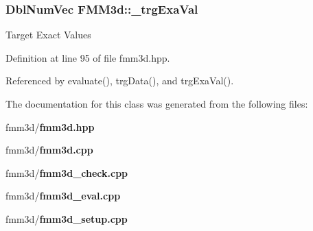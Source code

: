 \subsubsection{\setlength{\rightskip}{0pt plus 5cm}Dbl\-Num\-Vec {\bf FMM3d::\_\-trg\-Exa\-Val}\hspace{0.3cm}{\tt  [protected]}}\label{classFMM3d_0d54afb31dfb9ec532902e23da69f547_0d54afb31dfb9ec532902e23da69f547}


Target Exact Values 

Definition at line 95 of file fmm3d.hpp.

Referenced by evaluate(), trg\-Data(), and trg\-Exa\-Val().

The documentation for this class was generated from the following files:\begin{CompactItemize}
\item 
fmm3d/{\bf fmm3d.hpp}\item 
fmm3d/{\bf fmm3d.cpp}\item 
fmm3d/{\bf fmm3d\_\-check.cpp}\item 
fmm3d/{\bf fmm3d\_\-eval.cpp}\item 
fmm3d/{\bf fmm3d\_\-setup.cpp}\end{CompactItemize}
